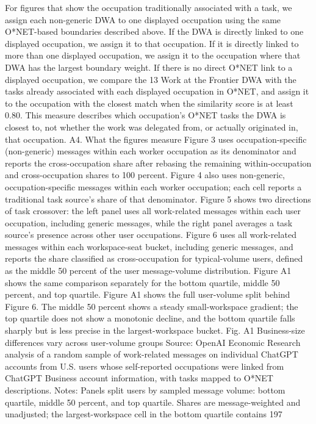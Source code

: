 For figures that show the occupation traditionally associated with a task, we assign each non-generic
DWA to one displayed occupation using the same O*NET-based boundaries described above. If the
DWA is directly linked to one displayed occupation, we assign it to that occupation. If it is directly
linked to more than one displayed occupation, we assign it to the occupation where that DWA has the
largest boundary weight. If there is no direct O*NET link to a displayed occupation, we compare the
13
Work at the Frontier
DWA with the tasks already associated with each displayed occupation in O*NET, and assign it to the
occupation with the closest match when the similarity score is at least 0.80. This measure describes
which occupation’s O*NET tasks the DWA is closest to, not whether the work was delegated from, or
actually originated in, that occupation.
A4. What the figures measure
Figure 3 uses occupation-specific (non-generic) messages within each worker occupation as its
denominator and reports the cross-occupation share after rebasing the remaining within-occupation
and cross-occupation shares to 100 percent. Figure 4 also uses non-generic, occupation-specific
messages within each worker occupation; each cell reports a traditional task source’s share of that
denominator. Figure 5 shows two directions of task crossover: the left panel uses all work-related
messages within each user occupation, including generic messages, while the right panel averages a task
source’s presence across other user occupations. Figure 6 uses all work-related messages within each
workspace-seat bucket, including generic messages, and reports the share classified as cross-occupation
for typical-volume users, defined as the middle 50 percent of the user message-volume distribution.
Figure A1 shows the same comparison separately for the bottom quartile, middle 50 percent, and top
quartile.
Figure A1 shows the full user-volume split behind Figure 6. The middle 50 percent shows a steady
small-workspace gradient; the top quartile does not show a monotonic decline, and the bottom quartile
falls sharply but is less precise in the largest-workspace bucket.
Fig. A1
Business-size differences vary across user-volume groups
Source: OpenAI Economic Research analysis of a random sample of work-related messages on individual ChatGPT accounts
from U.S. users whose self-reported occupations were linked from ChatGPT Business account information, with tasks mapped
to O*NET descriptions. Notes: Panels split users by sampled message volume: bottom quartile, middle 50 percent, and
top quartile. Shares are message-weighted and unadjusted; the largest-workspace cell in the bottom quartile contains 197
